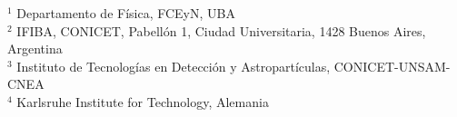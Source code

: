 \documentclass[a0paper,portrait,final,fontscale=0.302]{baposter}
\begin{document}
\begin{poster}
{  {\smaller[3] $^1$ Departamento de Física, FCEyN, UBA} \\ \vspace{-0.2cm}
  {\smaller[3] $^2$ IFIBA, CONICET, Pabellón 1, Ciudad Universitaria, 1428 Buenos Aires, Argentina}\\ \vspace{-0.2cm}
  {\smaller[3] $^3$ Instituto de Tecnologías en Detección y Astropartículas, CONICET-UNSAM-CNEA}\\ \vspace{-0.2cm}
  {\smaller[3] $^4$ Karlsruhe Institute for Technology, Alemania}\\ \vspace{-0.2cm}
}
{
  \setlength\fboxsep{0pt}
  \setlength\fboxrule{0.5pt}
}



\end{poster}
\end{document}
